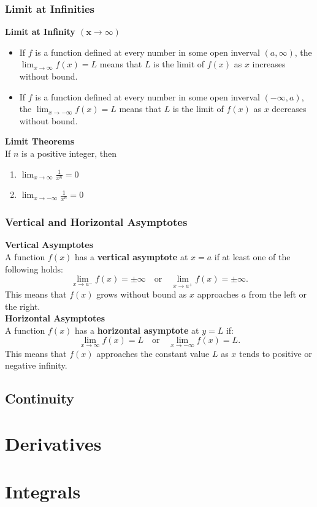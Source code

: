 \documentclass[11pt]{article}
\begin{document}
\subsubsection{Limit at Infinities}
\textbf{Limit at Infinity $\boldsymbol{(x\to\infty)}$}
\begin{itemize}
    \item If $f$ is a function defined at every number in some open inverval $(a,\infty)$,
        the $\displaystyle\lim_{x\to\infty}f(x)=L$ means that $L$ is the limit of $f(x)$ 
        as $x$ increases without bound.
    \item If $f$ is a function defined at every number in some open inverval $(-\infty, a)$,
        the $\displaystyle\lim_{x\to-\infty}f(x)=L$ means that $L$ is the limit of $f(x)$ 
        as $x$ decreases without bound.
\end{itemize}
\textbf{Limit Theorems}\\
If $n$ is a positive integer, then
\begin{enumerate}[label=(\alph*)]
    \item $
        \displaystyle 
        \lim_{x\to\infty}\frac{1}{x^n}=0
    $
    \item $
        \displaystyle 
        \lim_{x\to-\infty}\frac{1}{x^n}=0
    $
\end{enumerate}
\subsubsection{Vertical and Horizontal Asymptotes}
\textbf{Vertical Asymptotes}\\
A function $f(x)$ has a \textbf{vertical asymptote} at $x = a$ if at least one of the following holds:
\[
    \lim_{x \to a^-} f(x) = \pm\infty \quad \text{or} \quad \lim_{x \to a^+} f(x) = \pm\infty.
\]
\noindent
This means that $f(x)$ grows without bound as $x$ approaches $a$ from the left or the right.\\[.5em]
\textbf{Horizontal Asymptotes}\\
A function $f(x)$ has a \textbf{horizontal asymptote} at $y = L$ if:
\[
    \lim_{x \to \infty} f(x) = L \quad \text{or} \quad \lim_{x \to -\infty} f(x) = L.
\]
\noindent
This means that $f(x)$ approaches the constant value $L$ as $x$ tends to positive or negative infinity.
\subsection{Continuity}

\section{Derivatives}


\section{Integrals}
\end{document}
